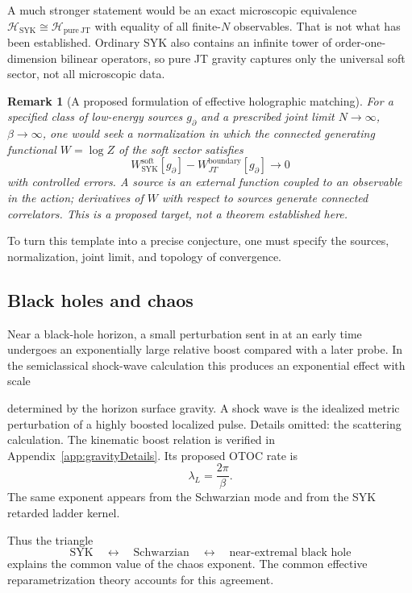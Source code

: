 \documentclass[11pt]{article}
\numberwithin{equation}{section}
\theoremstyle{exposition}
\newtheorem{remark}[definition]{Remark}
\theoremstyle{result}
\newcommand{\SYK}{\mathrm{SYK}}
\newcommand{\cH}{\mathcal H}
\begin{document}
A much stronger statement would be an exact microscopic equivalence $\cH_{\SYK}\cong\cH_{\mathrm{pure\ JT}}$ with equality of all finite-$N$ observables. That is not what has been established. Ordinary SYK also contains an infinite tower of order-one-dimension bilinear operators, so pure JT gravity captures only the universal soft sector, not all microscopic data.

\begin{remark}[A proposed formulation of effective holographic matching]
For a specified class of low-energy sources $g_{\partial}$ and a prescribed joint limit $N\to\infty$, $\beta\to\infty$, one would seek a normalization in which the connected generating functional $W=\log Z$ of the soft sector satisfies
\begin{equation*}
W^{\mathrm{soft}}_{\SYK}[g_{\partial}]
-W^{\mathrm{boundary}}_{JT}[g_{\partial}]
\to0
\end{equation*}
with controlled errors. A source is an external function coupled to an observable in the action; derivatives of $W$ with respect to sources generate connected correlators. This is a proposed target, not a theorem established here.
\end{remark}

To turn this template into a precise conjecture, one must specify the sources, normalization, joint limit, and topology of convergence.

\subsection{Black holes and chaos}

Near a black-hole horizon, a small perturbation sent in at an early time undergoes an exponentially large relative boost compared with a later probe. In the semiclassical shock-wave calculation this produces an exponential effect with scale

determined by the horizon surface gravity. A shock wave is the idealized metric perturbation of a highly boosted localized pulse. Details omitted: the scattering calculation. The kinematic boost relation is verified in Appendix~\ref{app:gravityDetails}. Its proposed OTOC rate is
\begin{equation*}
\lambda_L=\frac{2\pi}{\beta}.
\end{equation*}
The same exponent appears from the Schwarzian mode and from the SYK retarded ladder kernel.

Thus the triangle
\begin{equation*}
\SYK\quad\longleftrightarrow\quad\text{Schwarzian}\quad\longleftrightarrow\quad\text{near-extremal black hole}
\end{equation*}
explains the common value of the chaos exponent. The common effective reparametrization theory accounts for this agreement.
\end{document}
